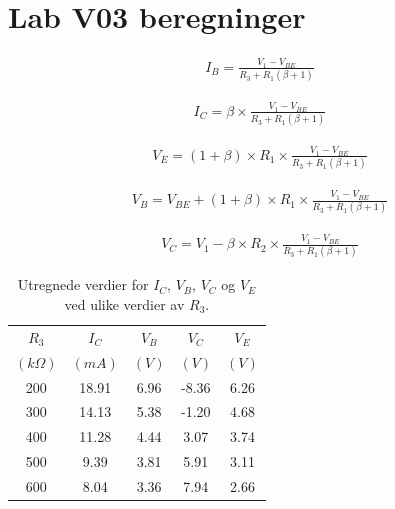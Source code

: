 \section*{Lab V03 beregninger} %

    \begin{align*}
        I_B = \frac{V_1 - V_{BE}}{R_3 + R_1(\beta + 1)}
    \end{align*}

    \begin{align*}
        I_C = \beta \times \frac{V_1 - V_{BE}}{R_3 + R_1(\beta + 1)}
    \end{align*}

    \begin{align*}
        V_E = (1 + \beta) \times R_1 \times \frac{V_1 - V_{BE}}{R_3 + R_1(\beta + 1)}
    \end{align*}

    \begin{align*}
        V_{B} = V_{BE} + (1 + \beta)\times R_1 \times \frac{V_1 - V_{BE}}{R_3 + R_1(\beta + 1)}
    \end{align*}

    \begin{align*}
        V_C = V_1 - \beta \times R_2 \times \frac{V_1 - V_{BE}}{R_3 + R_1(\beta + 1)}
    \end{align*}

    \begin{table}[H]
    \centering
    \begin{tabular}{|c|c|c|c|c|}
    \hline
    $R_3$ & $I_C$ & $V_B$ & $V_C$ & $V_E$ \\
    $(k\Omega)$ & $(mA)$ & $(V)$ & $(V)$ & $(V)$ \\
    \hline
    200 & 18.91 & 6.96 & -8.36 & 6.26 \\
    300 & 14.13 & 5.38 & -1.20 & 4.68 \\
    400 & 11.28 & 4.44 & 3.07 & 3.74 \\
    500 & 9.39  & 3.81 & 5.91 & 3.11 \\
    600 & 8.04  & 3.36 & 7.94 & 2.66 \\
    \hline
    \end{tabular}
    \caption{Utregnede verdier for $I_C$, $V_B$, $V_C$ og $V_E$ ved ulike verdier av $R_3$.}
    \label{tab:transistorverdier}
    \end{table}